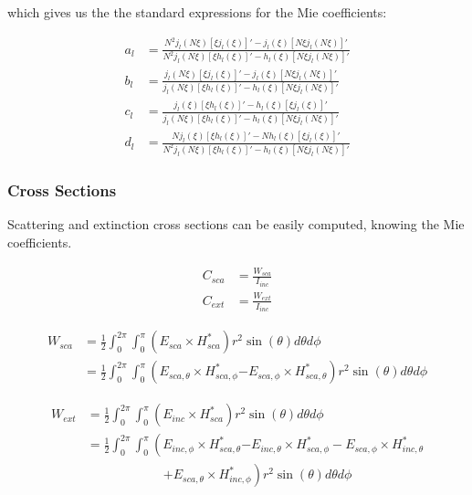         which gives us the the standard expressions for the Mie coefficients:

        \begin{align}
            a_l &= \frac{N^2 j_l(N\xi)[\xi j_l(\xi)]' - j_l(\xi)[N\xi j_l(N \xi)]'}{N^2 j_l(N\xi)[\xi h_l(\xi)]' - h_l(\xi)[N\xi j_l(N \xi)]'}\\
            b_l &= \frac{j_l(N\xi)[\xi j_l(\xi)]' - j_l(\xi)[N\xi j_l(N\xi)]'}{j_l(N\xi)[\xi h_l(\xi)]' - h_l(\xi)[N\xi j_l(N\xi)]'}\\
            c_l &= \frac{j_l(\xi)[\xi h_l(\xi)]' - h_l(\xi)[\xi j_l(\xi)]'}{j_l(N\xi)[\xi h_l(\xi)]' - h_l(\xi)[N\xi j_l(N\xi)]'}\\
            d_l &= \frac{Nj_l(\xi)[\xi h_l(\xi)]' - N h_l(\xi)[\xi j_l(\xi)]'}{N^2 j_l(N\xi)[\xi h_l(\xi)]' - h_l(\xi)[N\xi j_l(N\xi)]'}
        \end{align}

    \subsubsection{Cross Sections}
        Scattering and extinction cross sections can be easily computed, knowing the Mie coefficients.

        \begin{align}
            C_{sca} &= \frac{W_{sca}}{I_{inc}} \\
            C_{ext} &= \frac{W_{ext}}{I_{inc}}
        \end{align}

        \begin{align}
            W_{sca} &= \frac{1}{2}\int_0^{2\pi}\int_0^\pi \left(E_{sca} \times H^*_{sca}\right)r^2\sin(\theta)d\theta d\phi \\
             &= \frac{1}{2}\int_0^{2\pi}\int_0^\pi \left(E_{sca,\theta} \times H^*_{sca,\phi}\right.
                            \left.- E_{sca,\phi} \times H^*_{sca,\theta}\right)r^2\sin(\theta)d\theta d\phi
        \end{align}

        \begin{align}
            W_{ext} &= \frac{1}{2}\int_0^{2\pi}\int_0^\pi \left(E_{inc} \times H^*_{sca}\right)r^2\sin(\theta)d\theta d\phi \\
             &= \frac{1}{2}\int_0^{2\pi}\int_0^\pi \left(E_{inc,\phi} \times H^*_{sca,\theta}\right.
                            \left.- E_{inc,\theta} \times H^*_{sca,\phi} - E_{sca,\phi} \times H^*_{inc,\theta} \right.\nonumber\\
                                           &\qquad\qquad\qquad\left.+ E_{sca,\theta} \times H^*_{inc,\phi}\right)r^2\sin(\theta)d\theta d\phi
        \end{align}

